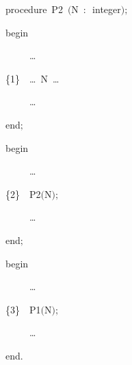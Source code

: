 {\begin{minipage}{\myparboxwidth}
\vspace{\neglskip}\mbox{\blc  \blk\blk\idt  \mcl procedure\idt \ P2\ $($N\ $:$\ integer$)$$;$}\par 
\vspace{\neglskip}\mbox{\blc  \blk\blk\idt  \mcl begin\idt }\par 
\vspace{\neglskip}\vspace{\neglskip}\mbox{\blc  \blk\blk\blk\idt  \cmt  \ \ \ \idt \ \ \ldots}\par 
\vspace{\neglskip}\vspace{\neglskip}\mbox{\blc  \blk\blk\blk\idt  \cmt  \{1\}\idt \ \ \ldots\ N\ \ldots}\par 
\vspace{\neglskip}\vspace{\neglskip}\mbox{\blc  \blk\blk\blk\idt  \cmt  \ \ \ \idt \ \ \ldots}\par 
\vspace{\neglskip}\mbox{\blc  \blk\blk\idt  \mcl end\idt $;$}\par 

\vspace{\neglskip}\mbox{\blc  \blk\idt  \mcl begin\idt }\par 
\vspace{\neglskip}\vspace{\neglskip}\mbox{\blc  \blk\blk\idt  \cmt  \ \ \ \idt \ \ \ldots}\par 
\vspace{\neglskip}\mbox{\blc  \blk\blk\idt  \cmt  \{2\}\idt \ \ P2$($N$)$$;$}\par 
\vspace{\neglskip}\vspace{\neglskip}\mbox{\blc  \blk\blk\idt  \cmt  \ \ \ \idt \ \ \ldots}\par 
\vspace{\neglskip}\mbox{\blc  \blk\idt  \mcl end\idt $;$}\par 

\vspace{\neglskip}\mbox{\blc  \idt  \mcl begin\idt }\par 
\vspace{\neglskip}\vspace{\neglskip}\mbox{\blc  \blk\idt  \cmt  \ \ \ \idt \ \ \ldots}\par 
\vspace{\neglskip}\mbox{\blc  \blk\idt  \cmt  \{3\}\idt \ \ P1$($N$)$$;$}\par 
\vspace{\neglskip}\vspace{\neglskip}\mbox{\blc  \blk\idt  \cmt  \ \ \ \idt \ \ \ldots}\par 
\vspace{\neglskip}\mbox{\blc  \idt  \mcl end\idt $.$}\par 

\vspace{\abovedisplayskip}
\end{minipage}
}
